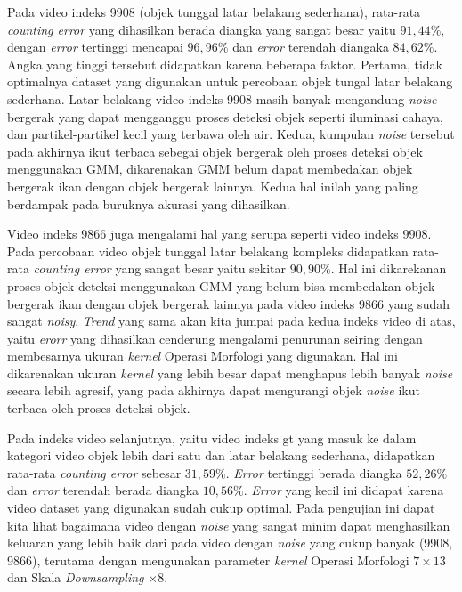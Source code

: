     	Pada video indeks 9908 (objek tunggal latar belakang sederhana), rata-rata \textit{counting error} yang dihasilkan berada diangka yang sangat besar yaitu $91,44\%$, dengan \textit{error} tertinggi mencapai $96,96\%$ dan \textit{error} terendah diangaka $84,62\%$. Angka yang tinggi tersebut didapatkan karena beberapa faktor. Pertama, tidak optimalnya dataset yang digunakan untuk percobaan objek tungal latar belakang sederhana. Latar belakang video indeks 9908 masih banyak mengandung \textit{noise} bergerak yang dapat mengganggu proses deteksi objek seperti iluminasi cahaya, dan partikel-partikel kecil yang terbawa oleh air. Kedua, kumpulan \textit{noise} tersebut pada akhirnya ikut terbaca sebegai objek bergerak oleh proses deteksi objek menggunakan GMM, dikarenakan GMM belum dapat membedakan objek bergerak ikan dengan objek bergerak lainnya. Kedua hal inilah yang paling berdampak pada buruknya akurasi yang dihasilkan.
    	
    	Video indeks 9866 juga mengalami hal yang serupa seperti video indeks 9908. Pada percobaan video objek tunggal latar belakang kompleks didapatkan rata-rata \textit{counting error} yang sangat besar yaitu sekitar $90,90\%$. Hal ini dikarekanan proses objek deteksi menggunakan GMM yang belum bisa membedakan objek bergerak ikan dengan objek bergerak lainnya pada video indeks 9866 yang sudah sangat \textit{noisy}. \textit{Trend} yang sama akan kita jumpai pada kedua indeks video di atas, yaitu \textit{erorr} yang dihasilkan cenderung mengalami penurunan seiring dengan membesarnya ukuran \textit{kernel} Operasi Morfologi yang digunakan. Hal ini dikarenakan ukuran \textit{kernel} yang lebih besar dapat menghapus lebih banyak \textit{noise} secara lebih agresif, yang pada akhirnya dapat mengurangi objek \textit{noise} ikut terbaca oleh proses deteksi objek.
    	
    	Pada indeks video selanjutnya, yaitu video indeks gt yang masuk ke dalam kategori video objek lebih dari satu dan latar belakang sederhana, didapatkan rata-rata \textit{counting error} sebesar $31,59\%$. \textit{Error} tertinggi berada diangka $52,26\%$ dan \textit{error} terendah berada diangka $10,56\%$. \textit{Error} yang kecil ini didapat karena video dataset yang digunakan sudah cukup optimal. Pada pengujian ini dapat kita lihat bagaimana video dengan \textit{noise} yang sangat minim dapat menghasilkan keluaran yang lebih baik dari pada video dengan \textit{noise} yang cukup banyak (9908, 9866), terutama dengan mengunakan parameter \textit{kernel} Operasi Morfologi $7\times13$ dan Skala \textit{Downsampling} $\times8$.
    	

